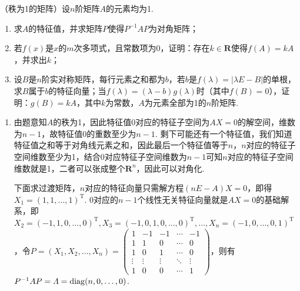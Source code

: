 \begin{exercise}
\begin{exgroup}
        \item （秩为1的矩阵）设$n$阶矩阵$A$的元素均为1.
        \begin{enumerate}
            \item 求$A$的特征值，并求矩阵$P$使得$P^{-1}AP$为对角矩阵；

            \item 若$f(x)$是$x$的$m$次多项式，且常数项为0，证明：存在$k\in\mathbf{R}$使得$f(A)=kA$，并求出$k$；

            \item 设$B$是$n$阶实对称矩阵，每行元素之和都为$b$，若$b$是$f(\lambda)=|\lambda E-B|$的单根，求$B$属于$b$的特征向量；当$f(\lambda)=(\lambda-b)g(\lambda)$时（其中$f(B)=0$），证明：$g(B)=kA$，其中$k$为常数，$A$为元素全部为1的$n$阶矩阵.
        \end{enumerate}
        \begin{answer}
            \begin{enumerate}
                \item 由题意知$A$的秩为1，因此特征值0对应的特征子空间为$AX=0$的解空间，维数为$n-1$，故特征值0的重数至少为$n-1$. 剩下可能还有一个特征值，我们知道特征值之和等于对角线元素之和，因此最后一个特征值等于$n$，$n$对应的特征子空间维数至少为1，结合0对应特征子空间维数为$n-1$可知$n$对应的特征子空间维数就是1，二者可以张成整个$\mathbf{R}^n$，因此可以对角化.

                      下面求过渡矩阵，$n$对应的特征向量只需解方程$(nE-A)X=0$，即得$X_1=(1,1,\ldots,1)^\mathrm{T}$. 0对应的$n-1$个线性无关特征向量就是$AX=0$的基础解系，即$X_2=(-1,1,0,\ldots,0)^\mathrm{T},X_3=(-1,0,1,0,\ldots,0)^\mathrm{T},\ldots,X_n=(-1,0,\ldots,0,1)^\mathrm{T}$，令$P=(X_1,X_2,\ldots,X_n)=\begin{pmatrix}
                              1 & -1 & -1 & \cdots & -1 \\ 1 & 1 & 0 & \cdots & 0 \\ 1 & 0 & 1 & \cdots & 0 \\ \vdots & \vdots & \vdots & \ddots & \vdots \\ 1 & 0 & 0 & \cdots & 1
                          \end{pmatrix}$，则有$P^{-1}AP=\varLambda=\operatorname{diag}(n,0,\ldots,0)$.


\end{enumerate}
\end{answer}
\end{exgroup}
\end{exercise}
